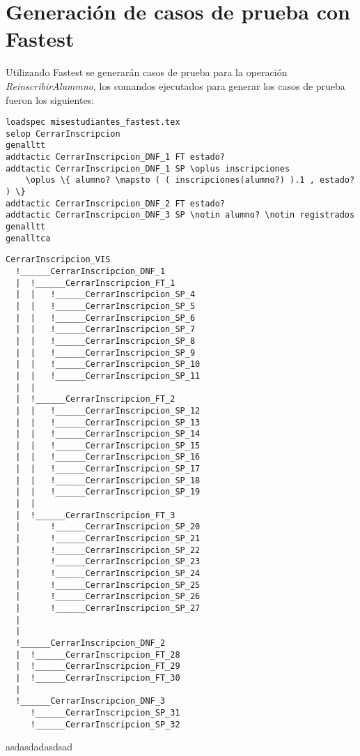 \documentclass{article}
\begin{document}
\section{Generación de casos de prueba con Fastest}
Utilizando Fastest se generarán casos de prueba para la operación \emph{ReinscribirAlummno}, los comandos ejecutados para generar los casos de prueba fueron los siguientes:

\begin{verbatim}
loadspec misestudiantes_fastest.tex
selop CerrarInscripcion
genalltt
addtactic CerrarInscripcion_DNF_1 FT estado?
addtactic CerrarInscripcion_DNF_1 SP \oplus inscripciones 
    \oplus \{ alumno? \mapsto ( ( inscripciones(alumno?) ).1 , estado? ) \}
addtactic CerrarInscripcion_DNF_2 FT estado?
addtactic CerrarInscripcion_DNF_3 SP \notin alumno? \notin registrados
genalltt
genalltca
\end{verbatim}

\begin{verbatim}
CerrarInscripcion_VIS
  !______CerrarInscripcion_DNF_1
  |	 !______CerrarInscripcion_FT_1
  |	 |	 !______CerrarInscripcion_SP_4
  |	 |	 !______CerrarInscripcion_SP_5
  |	 |	 !______CerrarInscripcion_SP_6
  |	 |	 !______CerrarInscripcion_SP_7
  |	 |	 !______CerrarInscripcion_SP_8
  |	 |	 !______CerrarInscripcion_SP_9
  |	 |	 !______CerrarInscripcion_SP_10
  |	 |	 !______CerrarInscripcion_SP_11
  |	 |
  |	 !______CerrarInscripcion_FT_2
  |	 |	 !______CerrarInscripcion_SP_12
  |	 |	 !______CerrarInscripcion_SP_13
  |	 |	 !______CerrarInscripcion_SP_14
  |	 |	 !______CerrarInscripcion_SP_15
  |	 |	 !______CerrarInscripcion_SP_16
  |	 |	 !______CerrarInscripcion_SP_17
  |	 |	 !______CerrarInscripcion_SP_18
  |	 |	 !______CerrarInscripcion_SP_19
  |	 |
  |	 !______CerrarInscripcion_FT_3
  |	 	 !______CerrarInscripcion_SP_20
  |	 	 !______CerrarInscripcion_SP_21
  |	 	 !______CerrarInscripcion_SP_22
  |	 	 !______CerrarInscripcion_SP_23
  |	 	 !______CerrarInscripcion_SP_24
  |	 	 !______CerrarInscripcion_SP_25
  |	 	 !______CerrarInscripcion_SP_26
  |	 	 !______CerrarInscripcion_SP_27
  |	
  |
  !______CerrarInscripcion_DNF_2
  |	 !______CerrarInscripcion_FT_28
  |	 !______CerrarInscripcion_FT_29
  |	 !______CerrarInscripcion_FT_30
  |
  !______CerrarInscripcion_DNF_3
  	 !______CerrarInscripcion_SP_31
  	 !______CerrarInscripcion_SP_32
\end{verbatim}

asdasdadasdsad

\begin{verbatim}
\end{verbatim}
\end{document}
